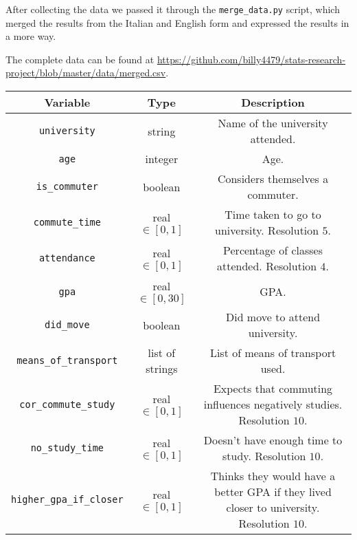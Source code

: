 \documentclass[12pt]{extarticle}
\numberwithin{table}{section}
\numberwithin{figure}{section}
\numberwithin{equation}{section}
\begin{document}
After collecting the data we passed it through the \texttt{merge\_data.py} script,
which merged the results from the Italian and English form and expressed the results in a more
 way.

The complete data can be found at
\url{https://github.com/billy4479/stats-research-project/blob/master/data/merged.csv}.

\begin{table}[H]
	\begin{center}
		\begin{tabular}{|c|c|c|}
			\hline
			\textbf{Variable}                & \textbf{Type}     & \textbf{Description}                                               \\
			\hline
			\texttt{university}              & string            & Name of the university attended.                                   \\
			\texttt{age}                     & integer           & Age.                                                               \\
			\texttt{is\_commuter}            & boolean           & Considers themselves a commuter.                                   \\
			\texttt{commute\_time}           & real $\in [0,1]$  & Time taken to go to university. Resolution $5$.                    \\
			\texttt{attendance}              & real $\in [0,1]$  & Percentage of classes attended. Resolution $4$.                    \\
			\texttt{gpa}                     & real $\in [0,30]$ & GPA.                                                               \\
			\texttt{did\_move}               & boolean           & Did move to attend university.                                     \\
			\texttt{means\_of\_transport}    & list of strings   & List of means of transport used.                                   \\
			\texttt{cor\_commute\_study}     & real $\in [0,1]$  & \makecell{Expects that commuting influences negatively studies.    \\ Resolution $10$.}                   \\
			\texttt{no\_study\_time}         & real $\in [0,1]$  & Doesn't have enough time to study. Resolution $10$.                \\
			\texttt{higher\_gpa\_if\_closer} & real $\in [0,1]$  & \makecell{Thinks they would have a better GPA if they              \\ lived closer to university. Resolution $10$.} \\

\end{tabular}
\end{center}
\end{table}
\end{document}
